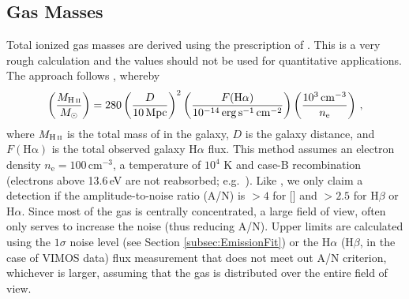 

	\subsection{Gas Masses}
		\label{subsec:GasMass}

		Total ionized gas masses are derived using the prescription of \citet{Sarzi2005}. This is a very rough calculation and the values should not be used for quantitative applications. The approach follows \citet{Kim1989}, whereby
		\begin{equation}
			\left(\frac{M_\text{\ion{H}{ii}}}{M_\odot}\right) = 280 \left(\frac{D}{10\, \mathrm{Mpc}}\right)^2 \left(\frac{F(\mathrm{H\alpha})}{10^{-14} \, \mathrm{erg \, s^{-1} \, cm^{-2}}}\right) \left(\frac{10^3 \, \mathrm{cm^{-3}}}{n_\mathrm{e}}\right) \, ,
		\end{equation}
		where $M_\text{\ion{H}{ii}}$ is the total mass of  in the galaxy, $D$ is the galaxy distance, and $F(\mathrm{H\alpha})$ is the total observed galaxy H$\alpha$ flux. This method assumes an electron density $n_\mathrm{e} = 100 \, \mathrm{cm^{-3}}$, a temperature of $10^4$ K and case-B recombination (electrons above 13.6\,eV are not reabsorbed; e.g.\ \citealt[p.\,74]{Osterbrock1974}). Like \citet{Sarzi2005}, we only claim a detection if the amplitude-to-noise ratio (A/N) is $>4$ for [] and $>2.5$ for H$\beta$ or H$\alpha$. Since most of the gas is centrally concentrated, a large field of view, often only serves to increase the noise (thus reducing A/N). 
		Upper limits are calculated using the $1\sigma$ noise level (see Section \ref{subsec:EmissionFit}) or the H$\alpha$ (H$\beta$, in the case of VIMOS data) flux measurement that does not meet out A/N criterion, whichever is larger, assuming that the gas is distributed over the entire field of view.


